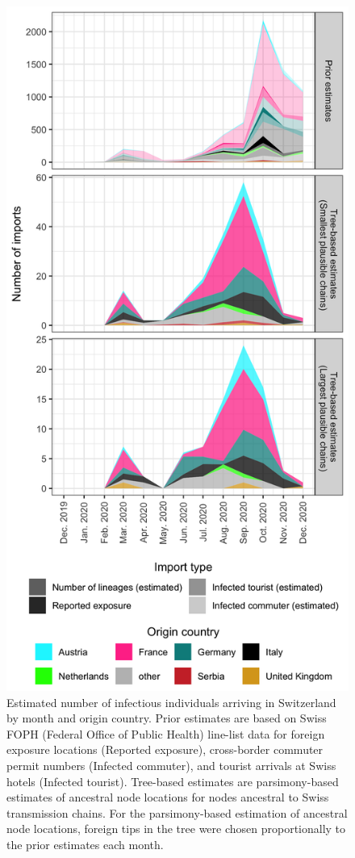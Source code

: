 \documentclass[9pt,twocolumn,twoside,lineno]{pnas-new}
\begin{document}
\begin{figure}[tbhp]
\centering
\includegraphics[width=.8\linewidth]{figures/fig_2_chain_origins.png}
\caption{Estimated number of infectious individuals arriving in Switzerland by month and origin country. Prior estimates are based on Swiss FOPH (Federal Office of Public Health) line-list data for foreign exposure locations (Reported exposure), cross-border commuter permit numbers (Infected commuter), and tourist arrivals at Swiss hotels (Infected tourist). Tree-based estimates are parsimony-based estimates of ancestral node locations for nodes ancestral to Swiss transmission chains. For the parsimony-based estimation of ancestral node locations, foreign tips in the tree were chosen proportionally to the prior estimates each month.}  
\label{fig:chain-origins}
\end{figure}
\end{document}
